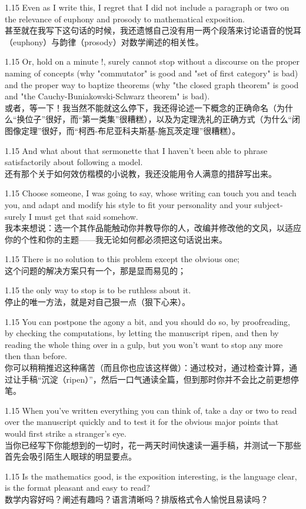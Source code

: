 \documentclass[12pt,a4paper]{article}
\newcommand{\bilingual}[2]{
    \begin{spacing}{1.15} %
        \noindent \normalsize #1 \\[-0.5ex] %
        \small \textcolor{blue!70!black}{#2} %
    \end{spacing}
    \vspace{0.8em} %
}
\begin{document}
\bilingual{Even as I write this, I regret that I did not include a paragraph or two on the relevance of euphony and prosody to mathematical exposition.}
{甚至就在我写下这句话的时候，我还遗憾自己没有用一两个段落来讨论语音的悦耳（euphony）与韵律（prosody）对数学阐述的相关性。} %

\bilingual{Or, hold on a minute !, surely cannot stop without a discourse on the proper naming of concepts (why "commutator" is good and "set of first category" is bad) and the proper way to baptize theorems (why "the closed graph theorem" is good and "the Cauchy-Buniakowski-Schwarz theorem" is bad).}
{或者，等一下！我当然不能就这么停下，我还得论述一下概念的正确命名（为什么“换位子”很好，而“第一类集”很糟糕），以及为定理洗礼的正确方式（为什么“闭图像定理”很好，而“柯西-布尼亚科夫斯基-施瓦茨定理”很糟糕）。} %

\bilingual{And what about that sermonette that I haven't been able to phrase satisfactorily about following a model.}
{还有那个关于如何效仿楷模的小说教，我还没能用令人满意的措辞写出来。} %

\bilingual{Choose someone, I was going to say, whose writing can touch you and teach you, and adapt and modify his style to fit your personality and your subject-surely I must get that said somehow.}
{我本来想说：选一个其作品能触动你并教导你的人，改编并修改他的文风，以适应你的个性和你的主题——我无论如何都必须把这句话说出来。} %

\bilingual{There is no solution to this problem except the obvious one;}
{这个问题的解决方案只有一个，那是显而易见的；} %

\bilingual{the only way to stop is to be ruthless about it.}
{停止的唯一方法，就是对自己狠一点（狠下心来）。} %

\bilingual{You can postpone the agony a bit, and you should do so, by proofreading, by checking the computations, by letting the manuscript ripen, and then by reading the whole thing over in a gulp, but you won't want to stop any more then than before.}
{你可以稍稍推迟这种痛苦（而且你也应该这样做）：通过校对，通过检查计算，通过让手稿“沉淀（ripen）”，然后一口气通读全篇，但到那时你并不会比之前更想停笔。} %

\bilingual{When you've written everything you can think of, take a day or two to read over the manuscript quickly and to test it for the obvious major points that would first strike a stranger's eye.}
{当你已经写下你能想到的一切时，花一两天时间快速读一遍手稿，并测试一下那些首先会吸引陌生人眼球的明显要点。} %

\bilingual{Is the mathematics good, is the exposition interesting, is the language clear, is the format pleasant and easy to read?}
{数学内容好吗？阐述有趣吗？语言清晰吗？排版格式令人愉悦且易读吗？} %
\end{document}
